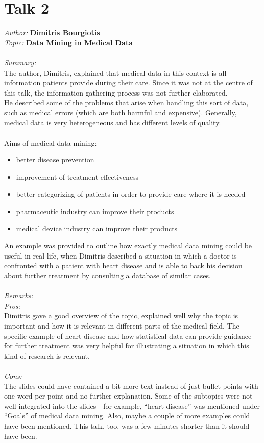 \documentclass[runningheads,a4paper]{llncs}
\begin{document}
\section{Talk 2}
\textit{Author:} \textbf{Dimitris Bourgiotis}\\
\textit{Topic:} \hspace{0.1cm} \textbf{Data Mining in Medical Data}\\
\\
\textit{Summary:} \\
The author, Dimitris, explained that medical data in this context is all information patients provide during their care. Since it was not at the centre of this talk, the information gathering process was not further elaborated.\\
He described some of the problems that arise when handling this sort of data, such as medical errors (which are both harmful and expensive). Generally, medical data is very heterogeneous and has different levels of quality.\\
\\
Aims of medical data mining:
\begin{itemize}
\item better disease prevention
\item improvement of treatment effectiveness
\item better categorizing of patients in order to provide care where it is needed
\item pharmaceutic industry can improve their products
\item medical device industry can improve their products
\end{itemize}
An example was provided to outline how exactly medical data mining could be useful in real life, when Dimitris described a situation in which a doctor is confronted with a patient with heart disease and is able to back his decision about further treatment by consulting a database of similar cases.\\
\\
\textit{Remarks:}\\
\textit{Pros:}\\
Dimitris gave a good overview of the topic, explained well why the topic is important and how it is relevant in different parts of the medical field. The specific example of heart disease and how statistical data can provide guidance for further treatment was very helpful for illustrating a situation in which this kind of research is relevant.\\
\\
\textit{Cons:}\\
The slides could have contained a bit more text instead of just bullet points with one word per point and no further explanation. Some of the subtopics were not well integrated into the slides - for example, ``heart disease'' was mentioned under ``Goals'' of medical data mining. Also, maybe a couple of more examples could have been mentioned. This talk, too, was a few minutes shorter than it should have been.



\end{document}
